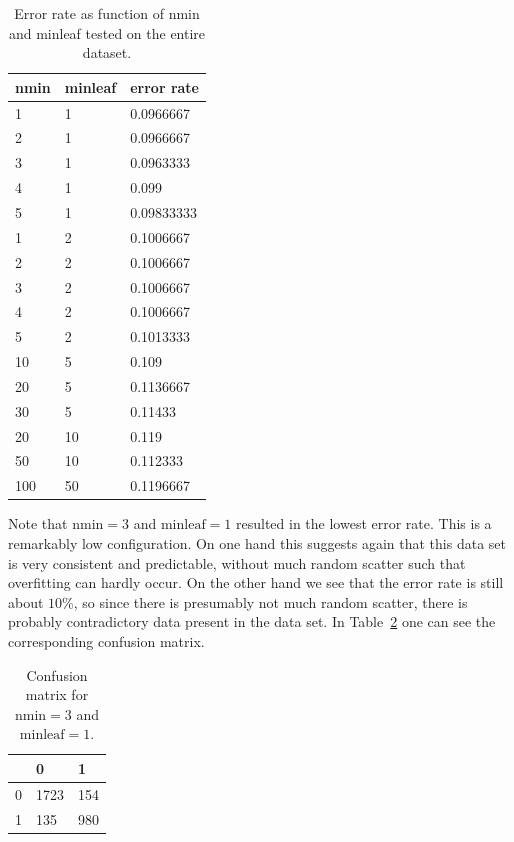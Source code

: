 \documentclass[12pt]{article}
\theoremstyle{definition}
\begin{document}
\begin{table}[h]
\centering
\begin{tabular}{lll}
    nmin & minleaf & error rate \\
    \hline \hline
    1 & 1  & 0.0966667 \\
    2 & 1  & 0.0966667 \\
    3 & 1  & 0.0963333 \\
    4 & 1  & 0.099 \\
    5 & 1  & 0.09833333 \\
    1 & 2  & 0.1006667 \\
    2 & 2  & 0.1006667 \\
    3 & 2  & 0.1006667 \\
    4 & 2  & 0.1006667 \\
    5 & 2  & 0.1013333 \\
    10 & 5  & 0.109 \\
    20 & 5  & 0.1136667 \\
    30 & 5  & 0.11433 \\
    20 & 10 & 0.119 \\
    50 & 10 & 0.112333 \\
    100 & 50 & 0.1196667 \\
\end{tabular}
\caption{Error rate as function of nmin and minleaf tested on the entire dataset.}
\label{table1}
\end{table}

Note that $\mathrm{nmin} = 3$ and $\mathrm{minleaf} = 1$ resulted in the lowest error rate.
This is a remarkably low configuration.
On one hand this suggests again that this data set is very consistent and predictable,
without much random scatter such that overfitting can hardly occur.
On the other hand we see that the error rate is still about $10\%$, so since there is presumably
not much random scatter, there is probably contradictory data present in the data set.
In Table~\ref{table2} one can see the corresponding confusion matrix.

\begin{table}[h]
\centering
\begin{tabular}{r||ll}
     & 0    & 1   \\
    \hline \hline
    0 & 1723 & 154 \\
    1 & 135  & 980 \\
\end{tabular}
\caption{Confusion matrix for $\mathrm{nmin} = 3$ and $\mathrm{minleaf} = 1$.}
\label{table2}
\end{table}
\end{document}
